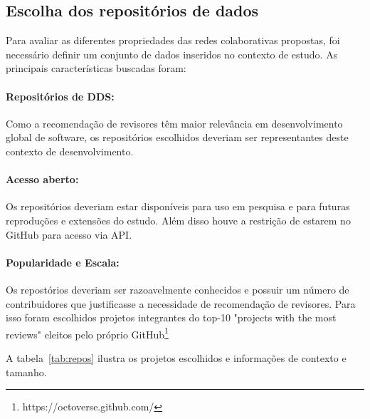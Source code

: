 \documentclass[sigconf]{acmart}
\begin{document}
\subsection{Escolha dos repositórios de dados}

Para avaliar as diferentes propriedades das redes colaborativas propostas, foi necessário definir um conjunto de dados inseridos no contexto de estudo. As principais características buscadas foram:

\paragraph{Repositórios de DDS:} Como a recomendação de revisores têm maior relevância em desenvolvimento global de software, os repositórios escolhidos deveriam ser representantes deste contexto de desenvolvimento.

\paragraph{Acesso aberto: } Os repositórios deveriam estar disponíveis para uso em pesquisa e para futuras reproduções e extensões do estudo. Além disso houve a restrição de estarem no GitHub para acesso via API.

\paragraph{Popularidade e Escala:} Os repostórios deveriam ser razoavelmente conhecidos e possuir um número de contribuidores que justificasse a necessidade de recomendação de revisores. Para isso foram escolhidos projetos integrantes do top-10 "projects with the most reviews" eleitos pelo próprio GitHub\footnote{https://octoverse.github.com/}

A tabela~\ref{tab:repos} ilustra os projetos escolhidos e informações de contexto e tamanho.

\begin{table}[!h]

\centering
{}
\caption{Descrição dos Respositórios Selecionados}
\label{tab:repos}
\end{table}
\end{document}
